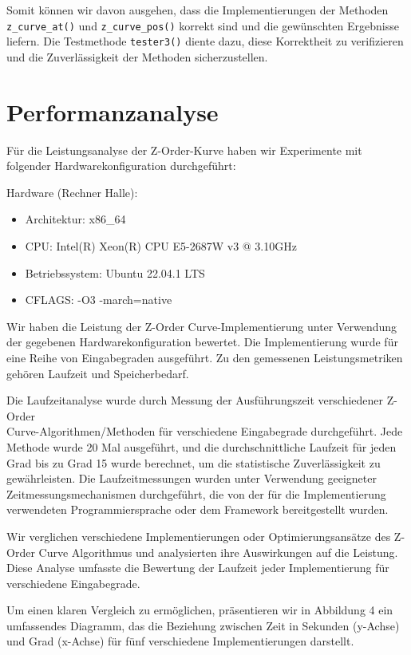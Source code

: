 \documentclass[course=erap]{aspdoc}
\begin{document}
\noindent Somit können wir davon ausgehen, dass die Implementierungen der Methoden\\ \texttt{z\_curve\_at()} und \texttt{z\_curve\_pos()} korrekt sind und die gewünschten Ergebnisse liefern. Die Testmethode \texttt{tester3()} diente dazu, diese Korrektheit zu verifizieren und die Zuverlässigkeit der Methoden sicherzustellen.


\section{Performanzanalyse}

\noindent Für die Leistungsanalyse der Z-Order-Kurve haben wir Experimente mit folgender Hardwarekonfiguration durchgeführt:

Hardware (Rechner Halle):
\begin{itemize}
  \item Architektur: x86\_64
  \item CPU: Intel(R) Xeon(R) CPU E5-2687W v3 @ 3.10GHz
  \item Betriebssystem: Ubuntu 22.04.1 LTS
  \item CFLAGS: -O3 -march=native
\end{itemize}

\noindent Wir haben die Leistung der Z-Order Curve-Implementierung unter Verwendung der gegebenen Hardwarekonfiguration bewertet. Die Implementierung wurde für eine Reihe von Eingabegraden ausgeführt. Zu den gemessenen Leistungsmetriken gehören Laufzeit und Speicherbedarf.

\noindent Die Laufzeitanalyse wurde durch Messung der Ausführungszeit verschiedener Z-Order\\ Curve-Algorithmen/Methoden für verschiedene Eingabegrade durchgeführt. Jede Methode wurde 20 Mal ausgeführt, und die durchschnittliche Laufzeit für jeden Grad bis zu Grad 15 wurde berechnet, um die statistische Zuverlässigkeit zu gewährleisten. Die Laufzeitmessungen wurden unter Verwendung geeigneter Zeitmessungsmechanismen durchgeführt, die von der für die Implementierung verwendeten Programmiersprache oder dem Framework bereitgestellt wurden.

\noindent Wir verglichen verschiedene Implementierungen oder Optimierungsansätze des Z-Order Curve Algorithmus und analysierten ihre Auswirkungen auf die Leistung. Diese Analyse umfasste die Bewertung der Laufzeit jeder Implementierung für verschiedene Eingabegrade.

\noindent Um einen klaren Vergleich zu ermöglichen, präsentieren wir in Abbildung 4 ein umfassendes Diagramm, das die Beziehung zwischen Zeit in Sekunden (y-Achse) und Grad (x-Achse) für fünf verschiedene Implementierungen darstellt.
\end{document}
